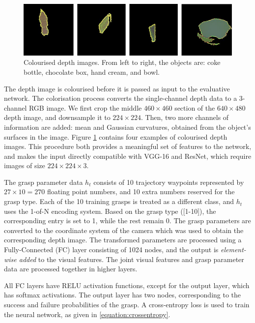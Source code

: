 \begin{figure}[h]
  \includegraphics[width=0.9\linewidth]{images/colourDepth.pdf}
  \caption[Colourised depth images.]{Colourised depth images. From left to right, the objects are: coke bottle, chocolate box, hand cream, and bowl.}
\label{fig:colorisedDepth}
\end{figure}

The depth image is colourised before it is passed as input to the evaluative network. The colorisation process converts the single-channel depth data to a 3-channel RGB image. We first crop the middle $460 \times 460$ section of the $640 \times 480$ depth image, and downsample it to $224 \times 224$. Then, two more channels of information are added: mean and Gaussian curvatures, obtained from the object's surfaces in the image. Figure \ref{fig:colorisedDepth} contains four examples of colourised depth images. This procedure both provides a meaningful set of features to the network, and makes the input directly compatible with VGG-16 and ResNet, which require images of size $224 \times 224 \times 3$.

The grasp parameter data $h_t$ consists of 10 trajectory waypoints represented by $27 \times 10 = 270$ floating point numbers, and 10 extra numbers reserved for the grasp type. Each of the 10 training grasps is treated as a different class, and $h_t$ uses the 1-of-N encoding system. Based on the grasp type ([1-10]), the corresponding entry is set to 1, while the rest remain 0. The grasp parameters are converted to the coordinate system of the camera which was used to obtain the corresponding depth image. The transformed parameters are processed using a Fully-Connected (FC) layer consisting of 1024 nodes, and the output is \textit{element-wise added} to the visual features. The joint visual features and grasp parameter data are processed together in higher layers.

All FC layers have RELU activation functions, except for the output layer, which has softmax activations. The output layer has two nodes, corresponding to the success and failure probabilities of the grasp. A cross-entropy loss is used to train the neural network, as given in \eq\ref{equation:crossentropy}.

